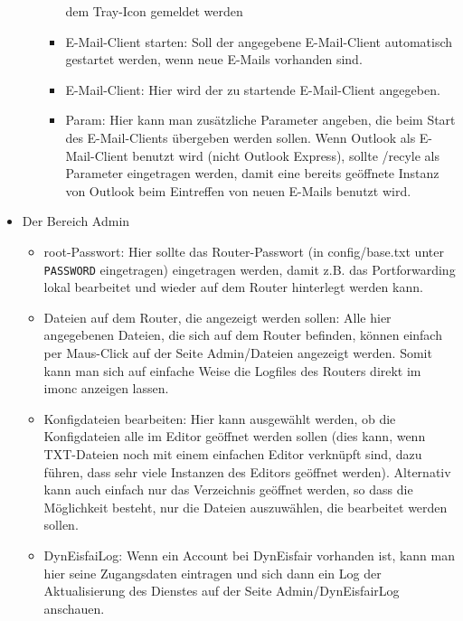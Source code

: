 \begin{itemize}
\begin{itemize}
\begin{itemize}
           dem Tray-Icon gemeldet werden
         \item \mbox{E-Mail}-Client starten: Soll der angegebene \mbox{E-Mail}-Client 
           automatisch gestartet werden, wenn neue \mbox{E-Mails} vorhanden sind.
         \item \mbox{E-Mail}-Client: Hier wird der zu startende \mbox{E-Mail}-Client angegeben.
         \item Param: Hier kann man zusätzliche Parameter angeben, die beim 
           Start des \mbox{E-Mail}-Clients übergeben werden sollen. Wenn Outlook als 
           \mbox{E-Mail}-Client benutzt wird (nicht Outlook Express), sollte /recyle als 
           Parameter eingetragen werden, damit eine bereits geöffnete Instanz 
           von Outlook beim Eintreffen von neuen \mbox{E-Mails} benutzt wird.
      \end{itemize}
    \end{itemize}

  \item Der Bereich Admin
    \begin{itemize}
      \item root-Passwort: Hier sollte das Router-Passwort (in config/base.txt 
        unter \verb+PASSWORD+ eingetragen) eingetragen werden, damit z.B. das 
        Portforwarding lokal bearbeitet und wieder auf dem Router hinterlegt 
        werden kann.
      \item Dateien auf dem Router, die angezeigt werden sollen: Alle hier 
        angegebenen Dateien, die sich auf dem Router befinden, können einfach 
        per Maus-Click auf der Seite Admin/Dateien angezeigt werden. Somit kann 
        man sich auf einfache Weise die Logfiles des Routers direkt im imonc 
        anzeigen lassen.
      \item Konfigdateien bearbeiten: Hier kann ausgewählt werden, ob die
        Konfigdateien alle im Editor geöffnet werden sollen (dies kann, wenn 
        TXT-Dateien noch mit einem einfachen Editor verknüpft sind, dazu führen, 
        dass sehr viele Instanzen des Editors geöffnet werden). Alternativ kann 
        auch einfach nur das Verzeichnis geöffnet werden, so dass die 
        Möglichkeit besteht, nur die Dateien auszuwählen, die bearbeitet werden 
        sollen.
      \item DynEisfaiLog: Wenn ein Account bei DynEisfair vorhanden ist, kann 
        man hier seine Zugangsdaten eintragen und sich dann ein Log der 
        Aktualisierung des Dienstes auf der Seite Admin/DynEisfairLog anschauen.     
    \end{itemize}


\end{itemize}
